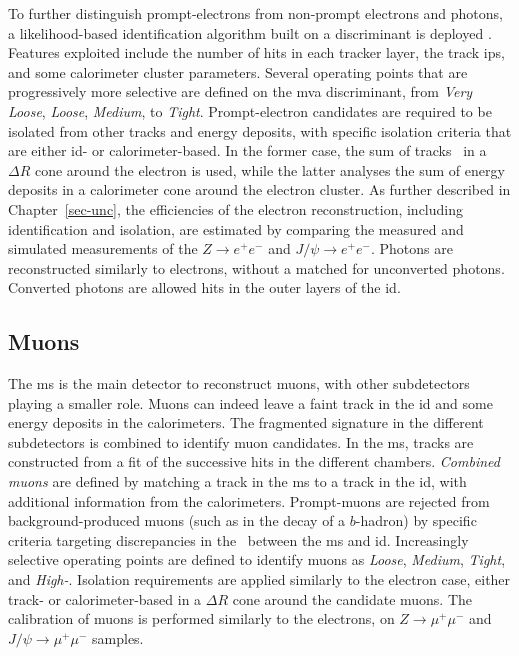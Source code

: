 To further distinguish prompt-electrons from non-prompt electrons and photons, a likelihood-based identification algorithm built on a  discriminant is deployed \cite{Aaboud:2657964}. Features exploited include the number of hits in each tracker layer, the track \glspl{ip}, and some calorimeter cluster parameters. Several operating points that are progressively more selective are defined on the \gls{mva} discriminant, from \textit{Very Loose}, \textit{Loose}, \textit{Medium}, to \textit{Tight}. Prompt-electron candidates are required to be isolated from other tracks and energy deposits, with specific isolation criteria that are either \gls{id}- or calorimeter-based. In the former case, the sum of tracks \pt\ in a $\Delta R$ cone around the electron is used, while the latter analyses the sum of energy deposits in a calorimeter cone around the electron cluster. As further described in Chapter~\ref{sec-unc}, the efficiencies of the electron reconstruction, including identification and isolation, are estimated by comparing the measured and simulated measurements of the $Z\rightarrow e^+e^-$ and $J/\psi\rightarrow e^+e^-$. Photons are reconstructed similarly to electrons, without a matched for unconverted photons. Converted photons are allowed hits in the outer layers of the \gls{id}. 

\subsection{Muons}\label{sec-atlas-mu}
The \gls{ms} is the main detector to reconstruct muons, with other subdetectors playing a smaller role. Muons can indeed leave a faint track in the \gls{id} and some energy deposits in the calorimeters. The fragmented signature in the different subdetectors is combined to identify muon candidates. In the \gls{ms}, tracks are constructed from a fit of the successive hits in the different chambers. \textit{Combined muons} are defined by matching a track in the \gls{ms} to a track in the \gls{id}, with additional information from the calorimeters. Prompt-muons are rejected from background-produced muons (such as in the decay of a $b$-hadron) by specific criteria targeting discrepancies in the \pt\ between the \gls{ms} and \gls{id}. Increasingly selective operating points are defined to identify muons as \textit{Loose}, \textit{Medium}, \textit{Tight}, and \textit{High-\pt}. Isolation requirements are applied similarly to the electron case, either track- or calorimeter-based in a $\Delta R$ cone around the candidate muons. The calibration of muons is performed similarly to the electrons, on $Z\rightarrow \mu^+\mu^-$ and $J/\psi\rightarrow \mu^+\mu^-$ samples.

